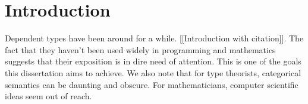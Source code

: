 \begin{comment}
\section{Introduction}

The goal of this thesis is to introduce dependent types to the undergraduate reader. We set out 

The goal of this dissertation is to learn how to mathematically design a programming language. 


The aim of this thesis is to introduce the notion of dependent types to an undergraduate reader. The main idea of dependent types is very simple, yet deceptively subtle however, since modelling such a formalism is quite tricky. This is evidenced by the fact that there is a lot of disagreement in type theory what has or hasn't been proven. This however is a familiar story in mathematics and is usually remedied by trying to understand what has been done better. Usually with the help of a new perspective. 

Dependent types however, are not only of interest to mathematicians but also programmers. Dependent type theory (much like simply typed lambda calculus) is very much a programming language allowing the expression of ideas previously too difficult to express. This is very much facilitated by its deep connection to predicate logic.
\end{comment}

\section{Introduction}

Dependent types have been around for a while. [[Introduction with citation]]. The fact that they haven't been used widely in programming and mathematics suggests that their exposition is in dire need of attention. This is one of the goals this dissertation aims to achieve. We also note that for type theorists, categorical semantics can be daunting and obscure. For mathematicians, computer scientific ideas seem out of reach. 


